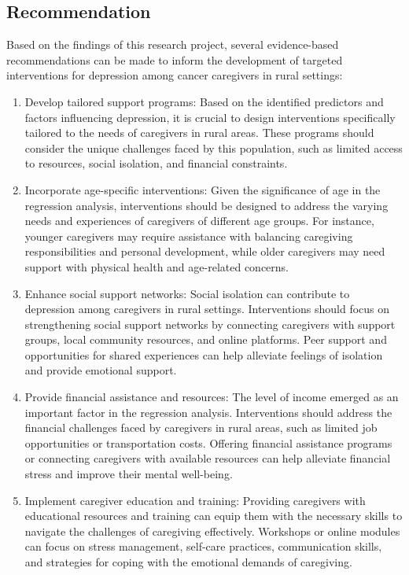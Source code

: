 \documentclass[11pt]{article}\usepackage[]{graphicx}\usepackage[]{xcolor}
\numberwithin{equation}{section}
\numberwithin{table}{section}
\begin{document}
\subsection{Recommendation}
Based on the findings of this research project, several evidence-based recommendations can be made to inform the development of targeted interventions for depression among cancer caregivers in rural settings:\\
\begin{enumerate}
	\item Develop tailored support programs: Based on the identified predictors and factors influencing depression, it is crucial to design interventions specifically tailored to the needs of caregivers in rural areas. These programs should consider the unique challenges faced by this population, such as limited access to resources, social isolation, and financial constraints.\\
	
	\item Incorporate age-specific interventions: Given the significance of age in the regression analysis, interventions should be designed to address the varying needs and experiences of caregivers of different age groups. For instance, younger caregivers may require assistance with balancing caregiving responsibilities and personal development, while older caregivers may need support with physical health and age-related concerns.\\
	
	\item Enhance social support networks: Social isolation can contribute to depression among caregivers in rural settings. Interventions should focus on strengthening social support networks by connecting caregivers with support groups, local community resources, and online platforms. Peer support and opportunities for shared experiences can help alleviate feelings of isolation and provide emotional support.\\  
	
	\item Provide financial assistance and resources: The level of income emerged as an important factor in the regression analysis. Interventions should address the financial challenges faced by caregivers in rural areas, such as limited job opportunities or transportation costs. Offering financial assistance programs or connecting caregivers with available resources can help alleviate financial stress and improve their mental well-being.\\
	
	\item Implement caregiver education and training: Providing caregivers with educational resources and training can equip them with the necessary skills to navigate the challenges of caregiving effectively. Workshops or online modules can focus on stress management, self-care practices, communication skills, and strategies for coping with the emotional demands of caregiving.\\
	
	
\end{enumerate}
\end{document}
